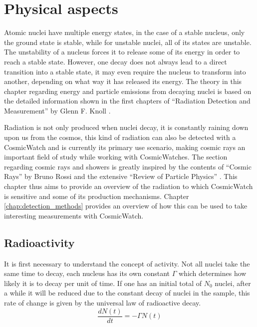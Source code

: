 \chapter{Physical aspects}

Atomic nuclei have multiple energy states, in the case of a stable nucleus, only the ground state is stable, while for unstable nuclei, all of its states are unstable. The unstability of a nucleus forces it to release some of its energy in order to reach a stable state. However, one decay does not always lead to a direct transition into a stable state, it may even require the nucleus to transform into another, depending on what way it has released its energy. The theory in this chapter regarding energy and particle emissions from decaying nuclei is based on the detailed information shown in the first chapters of ``Radiation Detection and Measurement'' by Glenn F. Knoll \cite{knoll2010radiation}. 

Radiation is not only produced when nuclei decay, it is constantly raining down upon us from the cosmos, this kind of radiation can also be detected with a CosmicWatch and is currently its primary use scenario, making cosmic rays an important field of study while working with CosmicWatches. The section regarding cosmic rays and showers is greatly inspired by the contents of ``Cosmic Rays'' by Bruno Rossi \cite{brunoRossi} and the extensive ``Review of Particle Physics'' \cite{ReviewOfParticlePhysics}. This chapter thus aims to provide an overview of the radiation to which CosmicWatch is sensitive and some of its production mechanisms. Chapter \ref{chap:detection_methods} provides an overview of how this can be used to take interesting measurements with CosmicWatch.

\section{Radioactivity}

It is first necessary to understand the concept of activity. Not all nuclei take the same time to decay, each nucleus has its own constant $\Gamma$ which determines how likely it is to decay per unit of time. If one has an initial total of $N_0$ nuclei, after a while it will be reduced due to the constant decay of nuclei in the sample, this rate of change is given by the universal law of radioactive decay.
\begin{equation}
    \frac{dN(t)}{dt} = -\Gamma N(t)
\end{equation}

